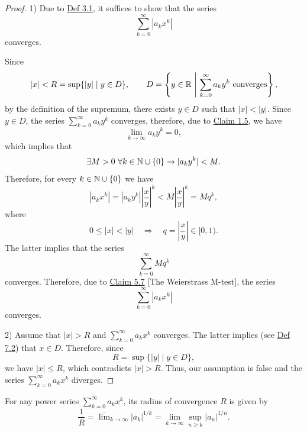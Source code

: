 \begin{proof}
1) Due to \hyperref[def:3.1]{Def 3.1}, it suffices to show that the series
\[
\sum_{k=0}^{\infty}|a_kx^k|
\]
converges.

Since
\[
|x|<R=\sup\{|y|\mid y\in D\},
\qquad
D=\left\{y\in\mathbb{R}\ \middle|\ \sum_{k=0}^{\infty}a_ky^k\text{ converges}\right\},
\]
by the definition of the supremum, there exists $y\in D$ such that $|x|<|y|$.
Since $y\in D$, the series $\sum_{k=0}^{\infty}a_ky^k$ converges, therefore, due to \hyperref[claim:1.5]{Claim 1.5}, we have
\[
\lim_{k\to\infty}a_ky^k=0,
\]
which implies that
\[
\exists M>0\ \forall k\in\mathbb{N}\cup\{0\}\to |a_ky^k|<M.
\]
Therefore, for every $k\in\mathbb{N}\cup\{0\}$ we have
\[
|a_kx^k|
=|a_ky^k|\left|\frac{x}{y}\right|^k
<M\left|\frac{x}{y}\right|^k
=Mq^k,
\]
where
\[
0\leq |x|<|y|\quad\Longrightarrow\quad q=\left|\frac{x}{y}\right|\in[0,1).
\]
The latter implies that the series
\[
\sum_{k=0}^{\infty}Mq^k
\]
converges. Therefore, due to \hyperref[claim:5.7]{Claim 5.7} [The Weierstrass M-test], the series
\[
\sum_{k=0}^{\infty}|a_kx^k|
\]
converges.

2) Assume that $|x|>R$ and $\sum_{k=0}^{\infty}a_kx^k$ converges.
The latter implies (see \hyperref[def:7.2]{Def 7.2}) that $x\in D$.
Therefore, since
\[
R=\sup\{|y|\mid y\in D\},
\]
we have $|x|\leq R$, which contradicts $|x|>R$.
Thus, our assumption is false and the series $\sum_{k=0}^{\infty}a_kx^k$ diverges.
\end{proof}

\begin{claim}\label{claim:7.2}
For any power series $\sum_{k=0}^{\infty}a_kx^k$, its radius of convergence $R$ is given by
\[
\frac{1}{R}
=
\overline{\lim}_{k\to\infty}|a_k|^{1/k}
=
\lim_{k\to\infty}\sup_{n\geq k}|a_n|^{1/n}.
\tag{*}\label{eq:7:star:1}
\]
\end{claim}

